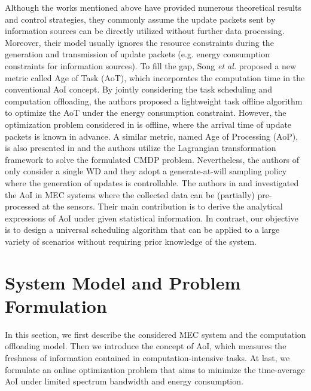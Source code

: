 \documentclass[lettersize, journal]{IEEEtran}
\begin{document}
Although the works mentioned above have provided numerous theoretical results and control strategies,
they commonly assume the update packets sent by information sources can be directly utilized without further data processing.
Moreover, their model usually ignores the resource constraints during the generation and transmission of update packets (e.g. energy consumption constraints for information sources).
To fill the gap, Song \textit{et al.} \cite{song2019age} proposed a new metric called Age of Task (AoT), which incorporates the computation time in the conventional AoI concept.
By jointly considering the task scheduling and computation offloading, 
the authors proposed a lightweight task offline algorithm to optimize the AoT under the energy consumption constraint.
However, the optimization problem considered in \cite{song2019age} is offline, where the arrival time of update packets is known in advance.
A similar metric, named Age of Processing (AoP), is also presented in \cite{li2021age} and the authors utilize the Lagrangian transformation framework to solve the formulated CMDP problem.
Nevertheless, the authors of \cite{li2021age} only consider a single WD and
they adopt a generate-at-will sampling policy where the generation of updates is controllable.
The authors in \cite{zou2021optimizing} and \cite{xu2019optimizing} investigated the AoI in MEC systems where the collected data can be (partially) pre-processed at the sensors.
Their main contribution is to derive the analytical expressions of AoI under given statistical information.
In contrast, our objective is to design a universal scheduling algorithm that can be applied to a large variety of scenarios 
without requiring prior knowledge of the system.

\section{System Model and Problem Formulation} \label{section:system_model}
In this section, we first describe the considered MEC system and the computation offloading model.
Then we introduce the concept of AoI, which measures the freshness of information contained in computation-intensive tasks.
At last, we formulate an online optimization problem that aims to minimize the time-average AoI under
limited spectrum bandwidth and energy consumption.
\end{document}
